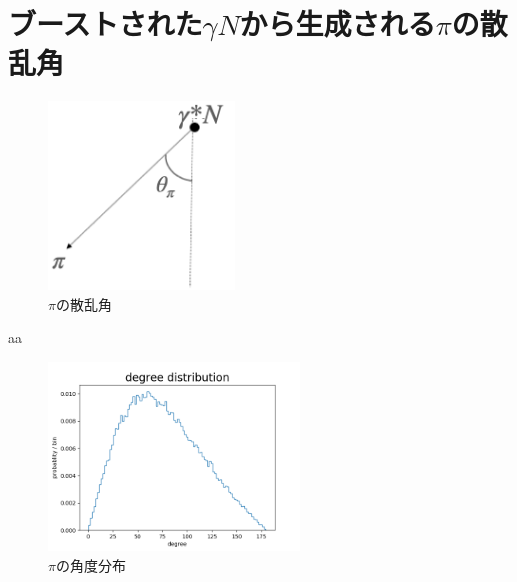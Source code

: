 \section{\texorpdfstring{ブーストされた$\gamma N$から生成される$\pi$の散乱角}{LG}}
\begin{figure}[H]
    \centering
    \includegraphics[height=5cm]{img/theta_pi.png}
    \caption{$\pi$の散乱角}
    \label{fig:angle7}
\end{figure}
aa
\begin{figure}[H]
    \centering
    \includegraphics[height=5cm]{img/degree_distribution.png}
    \caption{$\pi$の角度分布}
    \label{fig:angle8}
\end{figure}
